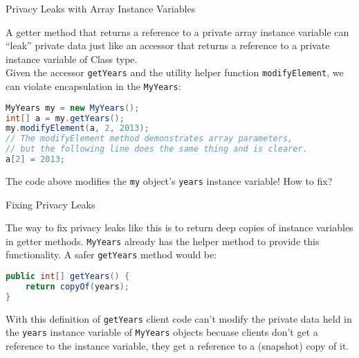 \documentclass{beamer}
\begin{document}
\begin{frame}[fragile]{Privacy Leaks with Array Instance Variables}


A getter method that returns a reference to a private array instance variable can ``leak'' private data just like an accessor that returns a reference to a private instance variable of Class type.\\
\vspace{.1in}
Given the accessor {\tt getYears} and the utility helper function {\tt modifyElement}, we can violate encapsulation in the {\tt MyYears}:
\begin{lstlisting}[language=Java]
MyYears my = new MyYears();
int[] a = my.getYears();
my.modifyElement(a, 2, 2013);
// The modifyElement method demonstrates array parameters,
// but the following line does the same thing and is clearer.
a[2] = 2013; 
\end{lstlisting}

The code above modifies the {\tt my} object's {\tt years} instance variable!  How to fix?

\end{frame}

\begin{frame}[fragile]{Fixing Privacy Leaks}


The way to fix privacy leaks like this is to return deep copies of instance variables in getter methods.  {\tt MyYears} already has the helper method to provide this functionality.  A safer {\tt getYears} method would be:
\begin{lstlisting}[language=Java]
public int[] getYears() {
    return copyOf(years);
}
\end{lstlisting}

With this definition of {\tt getYears} client code can't modify the private data held in the {\tt years} instance variable of {\tt MyYears} objects becuase clients don't get a reference to the instance variable, they get a reference to a (snapshot) copy of it.


\end{frame}
\end{document}
